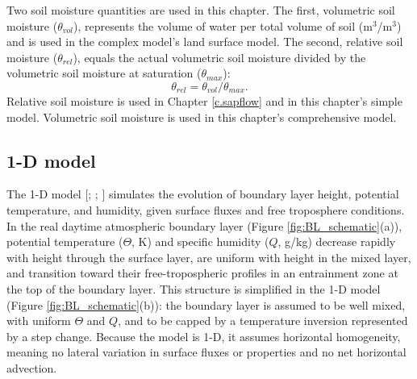 Two soil moisture quantities are used in this chapter.  The first, volumetric soil moisture ($\theta_{vol}$), represents the volume of water per total volume of soil (m$^3$/m$^3$) and is used in the complex model's land surface model.  The second, relative soil moisture ($\theta_{rel}$), equals the actual volumetric soil moisture divided by the volumetric soil moisture at saturation ($\theta_{max}$):
\begin{equation}
\theta_{rel} = \theta_{vol} / \theta_{max}.
\end{equation}
Relative soil moisture is used in Chapter \ref{c.sapflow} and in this chapter's simple model.  Volumetric soil moisture is used in this chapter's comprehensive model.

\subsection{1-D model}
The 1-D model [\cite{tennekes1981basic}; \cite{garratt1994atmospheric}; \cite{Siqueira:2009qf}] simulates the evolution of boundary layer height, potential temperature, and humidity, given surface fluxes and free troposphere conditions.  In the real daytime atmospheric boundary layer (Figure \ref{fig:BL_schematic}(a)), potential temperature ($\Theta$, K) and specific humidity ($Q$, g/kg) decrease rapidly with height through the surface layer, are uniform with height in the mixed layer, and transition toward their free-tropospheric profiles in an entrainment zone at the top of the boundary layer.  This structure is simplified in the 1-D model (Figure \ref{fig:BL_schematic}(b)): the boundary layer is assumed to be well mixed, with uniform $\Theta$ and $Q$, and to be capped by a temperature inversion represented by a step change.  Because the model is 1-D, it assumes horizontal homogeneity, meaning no lateral variation in surface fluxes or properties and no net horizontal advection.


